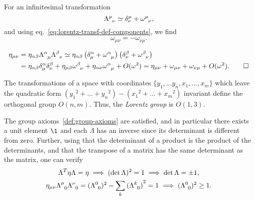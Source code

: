 For an infinitesimal transformation
\begin{equation}
    \tensor{\Lambda}{^\mu_\nu} \simeq \delta^\mu_\nu + \tensor{\omega}{^\mu_\nu} ,
\end{equation}
and using eq.~\eqref{eq:lorentz-transf-def-components}, we find
\begin{equation}\label{eq:parameters-lorentz}
    \omega_{\mu\nu} = -\omega_{\nu\mu} .
\end{equation}
\begin{mdframed}
\begin{innerproof}
    \begin{equation}
    \begin{split}
        \eta_{\mu\nu} &= \eta_{\alpha\beta} \tensor{\Lambda}{^\alpha_\mu} \tensor{\Lambda}{^\beta_\nu}
        \simeq \eta_{\alpha\beta} \left( \delta^\alpha_\mu + \tensor{\omega}{^\alpha_\mu} \right) \left(  \delta^\beta_\nu + \tensor{\omega}{^\beta_\nu} \right) 
        \\ &= \eta_{\alpha\beta} \delta^\alpha_\mu \delta^\beta_\nu + \eta_{\mu\beta} \tensor{\omega}{^\beta_\nu} + \eta_{\alpha\nu} \tensor{\omega}{^\alpha_\mu} + O(\omega^2)
        = \eta_{\mu\nu} + \omega_{\mu\nu} + \omega_{\nu\mu} + O(\omega^2) . \qedhere
    \end{split}
    \end{equation}
\end{innerproof}
\end{mdframed}

The transformations of a space with coordinates $\{y_1, \dots y_n, x_1, \dots, x_m\}$ which leave the quadratic form $( {y_1}^2 + \dots + {y_n}^2 ) - ( {x_1}^2 + \dots + {x_m}^2 )$ invariant define the orthogonal group $O(n,m)$. Thus, the \emph{Lorentz group} is $O(1,3)$.

The group axioms~\ref{def:group-axioms} are satisfied, and in particular there exists a unit element $\1$ and each $\Lambda$ has an inverse since its determinant is different from zero. Further, using that the determinant of a product is the product of the determinants, and that the transpose of a matrix has the same determinant as the matrix, one can verify
\begin{subequations}
\begin{gather}
    \Lambda^T \eta \Lambda = \eta \implies (\det \Lambda)^2 = 1 \implies \det \Lambda = \pm 1 , \\
    \eta_{\mu\nu} \tensor{\Lambda}{^\mu_0} \tensor{\Lambda}{^\nu_0} = (\tensor{\Lambda}{^0_0})^2 - \sum_k {(\tensor{\Lambda}{^k_0})}^2 = 1 \implies (\tensor{\Lambda}{^0_0})^2 \geq 1 .
\end{gather}
\end{subequations}

